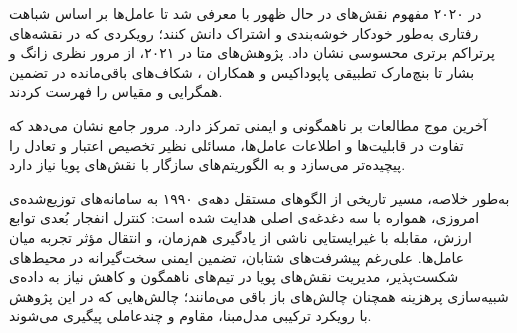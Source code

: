 در ۲۰۲۰ مفهوم نقش‌های در حال ظهور با  \cite{Wang2020ROMA} معرفی شد تا عامل‌ها بر اساس شباهت رفتاری به‌طور خودکار خوشه‌بندی و اشتراک دانش کنند؛ رویکردی که در نقشه‌های پرتراکم  برتری محسوسی نشان داد. پژوهش‌های متا در ۲۰۲۱، از مرور نظری زانگ و بشار \cite{Zhang2021Survey} تا بنچ‌مارک تطبیقی پاپوداکیس و همکاران
\cite{9583665}،
 شکاف‌های باقی‌مانده در تضمین همگرایی و مقیاس را فهرست کردند. 

آخرین موج مطالعات بر ناهمگونی و ایمنی تمرکز دارد. مرور جامع \cite{Yu2022Heterogeneous} نشان می‌دهد که تفاوت در قابلیت‌ها و اطلاعات عامل‌ها، مسائلی نظیر تخصیص اعتبار و تعادل را پیچیده‌تر می‌سازد و به الگوریتم‌های سازگار با نقش‌های پویا نیاز دارد.

به‌طور خلاصه، مسیر تاریخی  از الگوهای مستقل دهه‌ی ۱۹۹۰ به سامانه‌های توزیع‌شده‌ی امروزی، همواره با سه دغدغه‌ی اصلی هدایت شده است: کنترل انفجار بُعدی توابع ارزش، مقابله با غیرایستایی ناشی از یادگیری هم‌زمان، و انتقال مؤثر تجربه میان عامل‌ها. علی‌رغم پیشرفت‌های شتابان، تضمین ایمنی سخت‌گیرانه در محیط‌های شکست‌پذیر، مدیریت نقش‌های پویا در تیم‌های ناهمگون و کاهش نیاز به داده‌ی شبیه‌سازی پرهزینه همچنان چالش‌های باز باقی می‌مانند؛ چالش‌هایی که در این پژوهش با رویکرد ترکیبی مدل‌مبنا، مقاوم و چندعاملی پیگیری می‌شوند.
